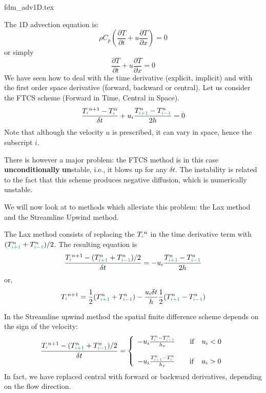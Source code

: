 \begin{flushright} {\tiny {\color{gray} fdm\_adv1D.tex}} \end{flushright}

%


The 1D advection equation is:
\begin{equation}
\rho C_p \left( \frac{\partial T}{\partial t}  
+ u \frac{\partial T}{\partial x} \right)=0 
\end{equation}
or simply
\begin{equation}
\frac{\partial T}{\partial t} + u \frac{\partial T}{\partial x}=0 
\end{equation}
We have seen how to deal with the time derivative (explicit, implicit) 
and with the first order space derivative (forward, backward or central).
Let us consider the FTCS scheme (Forward in Time, Central in Space).
\[
\frac{T_{\color{teal}i}^{n+1}-T^n_{\color{teal}i}}{\delta t} 
+ u_i \frac{T^n_{\color{teal}i+1} - T^n_{{\color{teal}i-1}}}{2h} =0 
\]
Note that although the velocity $u$ is prescribed, it can vary in space, hence
the subscript $i$. 

There is however a major problem: 
the FTCS method is in this case {\bf unconditionally} {\bf un}stable, i.e., it blows up for any $\delta t$.
The instability is related to the fact that this scheme produces negative diffusion, 
which is numerically unstable.

We will now look at to methods which alleviate this problem: the Lax method and the Streamline Upwind method.

The {\color{olive} Lax method} consists of replacing the $T_{\color{teal}i}^n$ 
in the time derivative term with $(T_{{\color{teal}i+1}}^n + T_{{\color{teal}i-1}}^n)/2$. 
The resulting equation is
\[
\frac{T_{\color{teal}i}^{n+1}-  (T_{{\color{teal}i+1}}^n + T_{{\color{teal}i-1}}^n)/2 }{\delta t} 
= - u_i \frac{T^n_{{\color{teal}i+1}}-T^n_{{\color{teal}i-1}}}{2 h}
\]
or, 
\[
T_{\color{teal}i}^{n+1} = \frac{1}{2} (T_{{\color{teal}i+1}}^n + T_{{\color{teal}i-1}}^n)  
- \frac{u_i \delta t}{h}  \frac{1}{2} (T^n_{{\color{teal}i+1}}-T^n_{{\color{teal}i-1}})
\]



In the {\color{olive}Streamline upwind} method the spatial finite difference scheme 
depends on the sign of the velocity:
\[
\frac{T_{\color{teal}i}^{n+1}-  (T_{{\color{teal}i+1}}^n + T_{{\color{teal}i-1}}^n)/2   }{\delta t} =
\left\{
\begin{array}{l}
 - u_i \frac{T^n_{{\color{teal}i}}-T^n_{{\color{teal}i-1}}}{h_x}  \quad\quad  {\rm if} \quad u_i<0\\ \\
 - u_i \frac{T^n_{{\color{teal}i+1}}-T^n_{{\color{teal}i}}}{h_x}  \quad\quad  {\rm if} \quad u_i>0
\end{array}
\right.
\]
In fact, we have replaced central with forward or backward derivatives, depending on the flow direction. 


